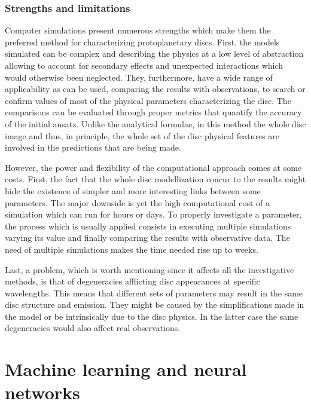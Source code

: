 \documentclass[a4paper,10pt]{report}
\begin{document}
\subsection{Strengths and limitations}

Computer simulations present numerous strengths which make them the preferred 
method for characterizing protoplanetary discs. First, the models simulated can be 
complex and describing the physics at a low level of abstraction
allowing to account for secondary effects and unexpected interactions which would otherwise been neglected.
They, furthermore, have a wide range of applicability as can be used, comparing the results with observations, to 
search or confirm values of most of the physical parameters characterizing the disc. 
The comparisons can be evaluated through
proper metrics that quantify the accuracy of the initial ansatz.
Unlike the analytical formulae, in this method the whole disc image and thus, in principle, the whole set of the
disc physical features are involved in the predictions that are being made.

However, the power and flexibility of the computational approach comes at some costs.
First, the fact that the whole disc modellization concur to the results might hide 
the existence of simpler and more interesting links between some parameters.
The major downside is yet the high computational cost of a simulation
which can run for hours or days. To properly investigate a parameter, the process which
is usually applied consists in executing multiple simulations varying its value and finally
comparing the results with observative data.
The need of multiple simulations makes the time needed rise up to weeks.

Last, a problem, which is worth mentioning since it affects all the investigative methods,
is that of degeneracies afflicting disc appearances at specific
wavelengths. This means that different sets of parameters may result in the same disc structure and emission.
They might be caused by the simplifications made in the model or be intrinsically due to the disc physics. 
In the latter case the same degeneracies would also affect real observations.

\chapter{Machine learning and neural networks}
\end{document}
